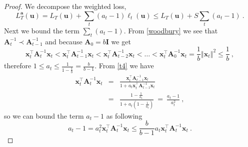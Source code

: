 \begin{proof}
We decompose the weighted loss,
\begin{equation}
L_{T}^{\boldsymbol{a}}(\mathbf{u}) =
L_{T}(\mathbf{u})+ \sum_t (a_t-1) \ell_{t}(\mathbf{u})  \leq
L_{T}(\mathbf{u})+ S \sum_t (a_t-1)~.
\label{decomposition}
\end{equation}
Next we bound the term $\sum_t (a_t-1)$. From \eqref{woodbury} we see that $\mathbf{A}_{t}^{-1}\prec\mathbf{A}_{t-1}^{-1}$
and because $\mathbf{A}_{0}=b\mathbf{I}$ we get
\[
\mathbf{x}_{t}^{\top}\mathbf{A}_{t}^{-1}\mathbf{x}_{t}<\mathbf{x}_{t}^{\top}\mathbf{A}_{t-1}^{-1}\mathbf{x}_{t}<\mathbf{x}_{t}^{\top}\mathbf{A}_{t-2}^{-1}\mathbf{x}_{t}<\ldots<\mathbf{x}_{t}^{\top}\mathbf{A}_{0}^{-1}\mathbf{x}_{t}=\frac{1}{b}\left\Vert \mathbf{x}_{t}\right\Vert ^{2}\leq\frac{1}{b}~,
\]
therefore $1\leq a_{t}\leq\frac{1}{1-\frac{1}{b}}=\frac{b}{b-1}$.
From \eqref{t4} we have
\begin{eqnarray*}
\mathbf{x}_{t}^{\top}\mathbf{A}_{t}^{-1}\mathbf{x}_{t}
 &=&
 \frac{\mathbf{x}_{t}^{\top}\mathbf{A}_{t-1}^{-1}\mathbf{x}_{t}}{1+a_{t}\mathbf{x}_{t}^{\top}\mathbf{A}_{t-1}^{-1}\mathbf{x}_{t}}\\
&=&\frac{1-\frac{1}{a_{t}}}{1+a_{t}\left(1-\frac{1}{a_{t}}\right)} ~=~\frac{a_{t}-1}{a_{t}^{2}}~,
\end{eqnarray*}
so we can bound the term $a_{t}-1$ as following
\begin{equation}
a_{t}-1=a_{t}^{2}\mathbf{x}_{t}^{\top}\mathbf{A}_{t}^{-1}\mathbf{x}_{t}\leq\frac{b}{b-1}a_{t}\mathbf{x}_{t}^{\top}\mathbf{A}_{t}^{-1}\mathbf{x}_{t}~. \label{t6}
\end{equation}
%

\end{proof}

